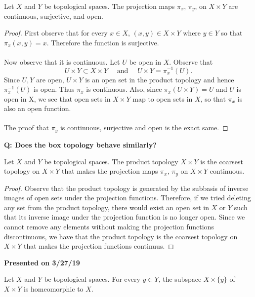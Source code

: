 \documentclass[letter,12pt,twoside]{hmcpset}
\begin{document}
\begin{problem}[Theorem 8.32]
    Let $X$ and $Y$ be topological spaces. The projection maps
    $\pi_x$, $\pi_y$, on $X \times Y$ are continuous, surjective, and
    open. 
\end{problem}

\begin{proof}
    First observe that for every $x \in X$, $(x, y) \in X \times Y$
    where $y \in Y$ so that $\pi_x(x, y) = x.$ Therefore the function
    is surjective.
    \\
    \\
    Now observe that it is continuous. Let $U$ be open in $X$. Observe
   that 
   \[
       U \times Y \subset X \times Y \quad \text{ and } \quad U \times Y =
    \pi_x^{-1}(U).
    \] 
    Since $U, Y$ are open, $U \times Y$ is an open set in
    the product topology and hence $\pi_x^{-1}(U)$ is open. Thus $\pi_x$ is
    continuous.
    Also, since $\pi_x(U \times Y) = U$ and $U$ is open in X, we see that open sets
    in $X \times Y$ map to open sets in $X$, so that $\pi_x$ is also
    an open function.
    \\
    \\ 
    The proof that $\pi_y$ is continuous, surjective and open is
    the exact same. 
\end{proof}

\noindent
\textbf{Q: Does the box topology behave similarly?}\\
\begin{problem}[Theorem 8.33]
    Let $X$ and $Y$ be topological spaces. The product topology $X
    \times Y$ is the coarsest topology on $X \times Y$ that makes the
    projection maps $\pi_x$, $\pi_y$ on $X \times Y$ continuous.
\end{problem}

\begin{proof}
    Observe that the product topology is generated by the subbasis of
    inverse images of open sets under the projection functions.
    Therefore, if we tried deleting any set from the product topology,
    there would exist an open set in $X$ or $Y$ such that its inverse
    image under the projection function is no longer open. Since we
    cannot remove any elements without making the projection functions
    discontinuous, we have that the product topology is the coarsest
    topology on $X \times Y$ that makes the projection functions
    continuus. 
\end{proof}

\noindent
\textbf{Presented on 3/27/19}\\
\begin{problem}[Theorem 8.35]
    Let $X$ and $Y$ be topological spaces. For every $y \in Y$, the
    subspace $X \times \{y\}$ of $X \times Y$ is homeomorphic to $X$.
\end{problem}
\end{document}
